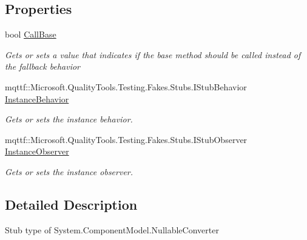 \subsection*{Properties}
\begin{DoxyCompactItemize}
\item 
bool \hyperlink{class_system_1_1_component_model_1_1_fakes_1_1_stub_nullable_converter_acacbcf6f26a50b784ba4dbb8bada224a}{Call\-Base}
\begin{DoxyCompactList}\small\item\em Gets or sets a value that indicates if the base method should be called instead of the fallback behavior\end{DoxyCompactList}\item 
mqttf\-::\-Microsoft.\-Quality\-Tools.\-Testing.\-Fakes.\-Stubs.\-I\-Stub\-Behavior \hyperlink{class_system_1_1_component_model_1_1_fakes_1_1_stub_nullable_converter_a120004ddd087530142549e52d19d72e6}{Instance\-Behavior}
\begin{DoxyCompactList}\small\item\em Gets or sets the instance behavior.\end{DoxyCompactList}\item 
mqttf\-::\-Microsoft.\-Quality\-Tools.\-Testing.\-Fakes.\-Stubs.\-I\-Stub\-Observer \hyperlink{class_system_1_1_component_model_1_1_fakes_1_1_stub_nullable_converter_ae4174f3f650b6ca71d576471036c1300}{Instance\-Observer}
\begin{DoxyCompactList}\small\item\em Gets or sets the instance observer.\end{DoxyCompactList}\end{DoxyCompactItemize}


\subsection{Detailed Description}
Stub type of System.\-Component\-Model.\-Nullable\-Converter



